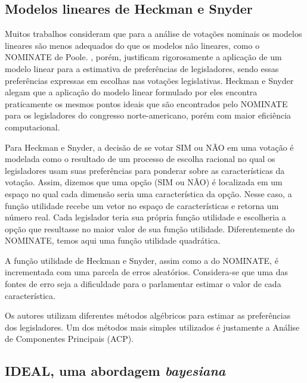 \documentclass[
	article,			%
	12pt,				%
    twoside,			%
	a4paper,			%
	english,			%
	french,				%
	spanish,			%
	brazil,				%
	]{abntex2}
\newcommand\nay{NÃO\xspace}
\newcommand\yea{SIM\xspace}
\newcommand\nominate{NOMINATE\xspace}
\begin{document}
\subsection{Modelos lineares de Heckman e Snyder}

Muitos trabalhos consideram que para a análise de votações nominais os modelos lineares são menos adequados do que os modelos não lineares, como o \nominate de Poole. , porém, justificam rigorosamente a aplicação de um modelo linear para a estimativa de preferências de legisladores, sendo essas preferências expressas em escolhas nas votações legislativas. Heckman e Snyder alegam que a aplicação do modelo linear formulado por eles encontra praticamente os mesmos pontos ideais que são encontrados pelo \nominate para os legisladores do congresso norte-americano, porém com maior eficiência computacional.

Para Heckman e Snyder, a decisão de se votar \yea ou \nay em uma votação é modelada como o resultado de um processo de escolha racional no qual os legisladores usam suas preferências para ponderar sobre as características da votação. Assim, dizemos que uma opção (\yea ou \nay) é localizada em um espaço no qual cada dimensão seria uma característica da opção. Nesse caso, a função utilidade recebe um vetor no espaço de características e retorna um número real. Cada legislador teria sua própria função utilidade e escolheria a opção que resultasse no maior valor de sua função utilidade. Diferentemente do NOMINATE, temos aqui uma função utilidade quadrática.

A função utilidade de Heckman e Snyder, assim como a do NOMINATE, é incrementada com uma parcela de erros aleatórios. Considera-se que uma das fontes de erro seja a dificuldade para o parlamentar estimar o valor de cada característica. 

Os autores utilizam diferentes métodos algébricos para estimar as preferências dos legisladores. Um dos métodos mais simples utilizados é justamente a Análise de Componentes Principais (ACP). 

\subsection{IDEAL, uma abordagem \emph{bayesiana}}
\end{document}
